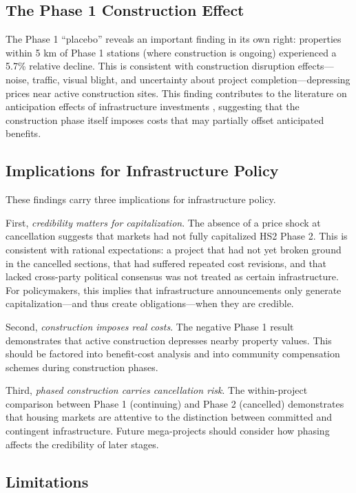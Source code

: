 \documentclass[12pt]{article}
\begin{document}
\subsection{The Phase 1 Construction Effect}

The Phase 1 ``placebo'' reveals an important finding in its own right: properties within 5 km of Phase 1 stations (where construction is ongoing) experienced a 5.7\% relative decline. This is consistent with construction disruption effects---noise, traffic, visual blight, and uncertainty about project completion---depressing prices near active construction sites. This finding contributes to the literature on anticipation effects of infrastructure investments \citep{devries2023}, suggesting that the construction phase itself imposes costs that may partially offset anticipated benefits.

\subsection{Implications for Infrastructure Policy}

These findings carry three implications for infrastructure policy.

First, \textit{credibility matters for capitalization}. The absence of a price shock at cancellation suggests that markets had not fully capitalized HS2 Phase 2. This is consistent with rational expectations: a project that had not yet broken ground in the cancelled sections, that had suffered repeated cost revisions, and that lacked cross-party political consensus was not treated as certain infrastructure. For policymakers, this implies that infrastructure announcements only generate capitalization---and thus create obligations---when they are credible.

Second, \textit{construction imposes real costs}. The negative Phase 1 result demonstrates that active construction depresses nearby property values. This should be factored into benefit-cost analysis and into community compensation schemes during construction phases.

Third, \textit{phased construction carries cancellation risk}. The within-project comparison between Phase 1 (continuing) and Phase 2 (cancelled) demonstrates that housing markets are attentive to the distinction between committed and contingent infrastructure. Future mega-projects should consider how phasing affects the credibility of later stages.

\subsection{Limitations}
\end{document}
